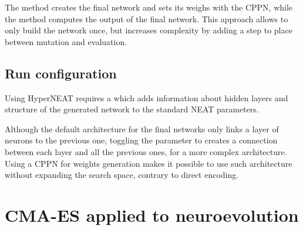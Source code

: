 The  method creates the final network and sets its weighs with the CPPN, while the  method computes the output of the final network. This approach allows to only build the network once, but increases complexity by adding a step to place between mutation and evaluation.

\subsection{Run configuration}

Using HyperNEAT requires a  which adds information about hidden layers and structure of the generated network to the standard NEAT parameters. 

Although the default architecture for the final networks only links a layer of neurons to the previous one, toggling the  parameter to  creates a connection between each layer and all the previous ones, for a more complex architecture. Using a CPPN for weights generation makes it possible to use such architecture without expanding the search space, contrary to direct encoding. 

\section{CMA-ES applied to neuroevolution}

